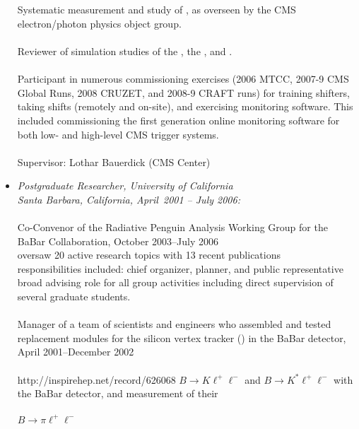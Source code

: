 \documentclass [12pt]{report}
\begin{document}
\begin{itemize}
{\\ \\
Systematic measurement and study of , as overseen by the CMS electron/photon physics object group. 
\\ \\
Reviewer of simulation studies of the , the , and  .
\\ \\
Participant in numerous commissioning exercises (2006 MTCC, 2007-9 CMS Global Runs, 2008 CRUZET, and 2008-9 CRAFT runs) for training shifters, taking shifts (remotely and on-site), and exercising monitoring software. This included commissioning the first generation online monitoring software for both low- and high-level CMS trigger systems.
\\ \\
Supervisor:  Lothar Bauerdick (CMS Center)

}

\item{{\em Postgraduate Researcher, University of California 
\\ Santa Barbara, California, April~2001 -- July 2006:}
\\ \\ Co-Convenor of the
Radiative Penguin Analysis Working Group for the BaBar Collaboration,
October 2003--July 2006 \\ 
oversaw 20 active research topics with 13 recent publications\\ 
responsibilities included: chief organizer, planner, and public representative\\ broad advising role for all group activities including direct supervision 
of several graduate students.
\\ \\
Manager of a team of scientists and
engineers who assembled and tested replacement modules for the silicon
vertex tracker () in the BaBar detector, April 2001--December 2002\\ \\ 
{http://inspirehep.net/record/626068} 
$B \rightarrow K\ell^+\ell^-$ and $B \rightarrow K^{*}\ell^+\ell^-$ 
with the BaBar detector, and measurement of their \\ \\
$B \rightarrow \pi\ell^+\ell^-$ \\

}
\end{itemize}
\end{document}

